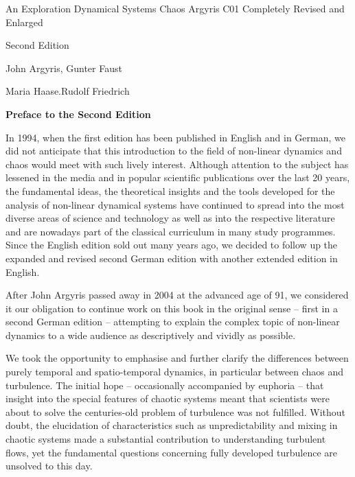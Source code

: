 \documentclass[12pt]{article}
\begin{document}
An Exploration Dynamical Systems Chaos Argyris C01 Completely Revised and Enlarged

Second Edition

John Argyris, Gunter Faust

Maria Haase.Rudolf Friedrich

\hfill

\textbf{Preface to the Second Edition} 

\hfill

In 1994, when the first edition has been published in English and in German, we did
not anticipate that this introduction to the field of non-linear dynamics and chaos
would meet with such lively interest. Although attention to the subject has lessened
in the media and in popular scientific publications over the last 20 years, the
fundamental ideas, the theoretical insights and the tools developed for the analysis
of non-linear dynamical systems have continued to spread into the most diverse
areas of science and technology as well as into the respective literature and are
nowadays part of the classical curriculum in many study programmes. Since the
English edition sold out many years ago, we decided to follow up the expanded and
revised second German edition with another extended edition in English.

\hfill

After John Argyris passed away in 2004 at the advanced age of 91, we considered it
our obligation to continue work on this book in the original sense – first in a second
German edition – attempting to explain the complex topic of non-linear dynamics
to a wide audience as descriptively and vividly as possible.

\hfill

We took the opportunity to emphasise and further clarify the differences between
purely temporal and spatio-temporal dynamics, in particular between chaos and
turbulence. The initial hope – occasionally accompanied by euphoria – that insight
into the special features of chaotic systems meant that scientists were about to
solve the centuries-old problem of turbulence was not fulfilled. Without doubt, the
elucidation of characteristics such as unpredictability and mixing in chaotic systems
made a substantial contribution to understanding turbulent flows, yet the fundamental
questions concerning fully developed turbulence are unsolved to this day.

\hfill
\end{document}
